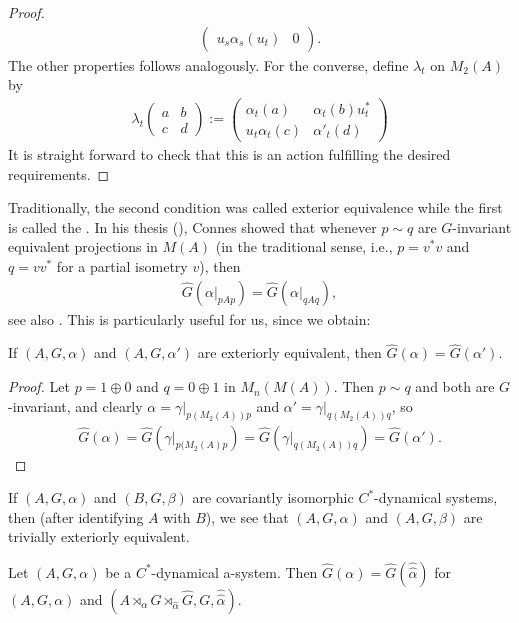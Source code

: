 \begin{proof}
\begin{align*}
\begin{pmatrix}
		u_s \alpha_s(u_t) & 0
	\end{pmatrix}.
\end{align*}
The other properties follows analogously. For the converse, define $\lambda_t$ on $M_2(A)$ by
\begin{align*}
	\lambda_t \begin{pmatrix}
		a & b \\
		c & d
	\end{pmatrix}:=
	\begin{pmatrix}
		\alpha_t(a) & \alpha_t(b) u_t^*\\
		u_t \alpha_t(c) & \alpha'_t(d)
	\end{pmatrix}
\end{align*}
It is straight forward to check that this is an action fulfilling the desired requirements.
\end{proof}
Traditionally, the second condition was called exterior equivalence while the first is called the . In his thesis (\cite[2.2.5]{connesclassification}), Connes showed that whenever $p\sim q$ are $G$-invariant equivalent projections in $M(A)$ (in the traditional sense, i.e., $p = v^*v$ and $ q = v v^*$ for a partial isometry $v$), then
\begin{align*}
	\hat G (\alpha |_{pAp}) = \hat G (\alpha|_{qAq}),
\end{align*}
see also \cite[lemma 4.3]{olesenpedersen1}. This is particularly useful for us, since we obtain:
\begin{proposition}
	If $(A,G,\alpha)$ and $(A, G , \alpha')$ are exteriorly equivalent, then $\hat G(\alpha) = \hat G(\alpha')$.
\end{proposition}
\begin{proof}
	Let $p = 1 \oplus 0$ and $q = 0 \oplus 1$ in $M_n(M(A))$. Then $p \sim q$ and both are $G$-invariant, and clearly $\alpha = \gamma | _{p(M_2(A))p}$ and $\alpha' = \gamma|_{q (M_2(A))q}$, so
	\begin{align*}
		\hat G(\alpha) = \hat G ( \gamma|_{p(M_2(A)p}) = \hat G(\gamma|_{q(M_2(A))q}) = \hat G(\alpha').
	\end{align*}
\end{proof}
\begin{remark}
	If $(A, G, \alpha)$ and $(B, G, \beta)$ are covariantly isomorphic $C^*$-dynamical systems, then (after identifying $A$ with $B$), we see that $(A,G, \alpha)$ and $(A, G, \beta)$ are trivially exteriorly equivalent.
\end{remark}
\begin{theorem}
	Let $(A,G,\alpha)$ be a $C^*$-dynamical a-system. Then $\hat G(\alpha)=\hat G (\hat{\hat \alpha})$ for $(A, G, \alpha)$ and $(A \rtimes_\alpha G \rtimes_{\hat \alpha} \hat G, G, \hat{\hat \alpha})$.
	\label{dualactionspectrum}
\end{theorem}
